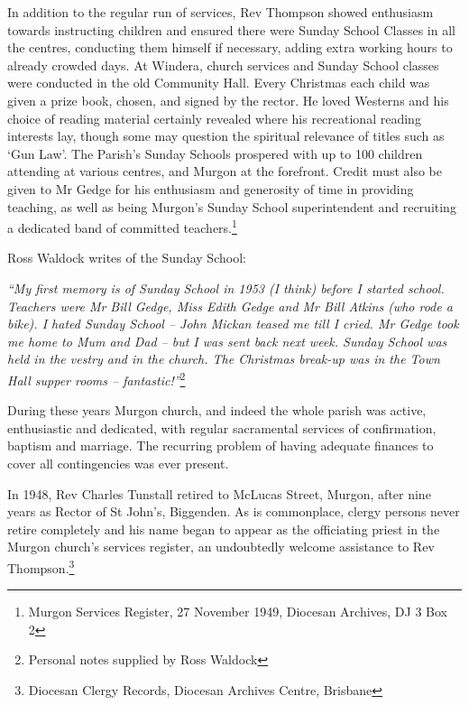 In addition to the regular run of services, Rev Thompson showed enthusiasm towards instructing children and ensured there were Sunday School Classes in all the centres, conducting them himself if necessary, adding extra working hours to already crowded days. At Windera, church services and Sunday School classes were conducted in the old Community Hall. Every Christmas each child was given a prize book, chosen, and signed by the rector. He loved Westerns and his choice of reading material certainly revealed where his recreational reading interests lay, though some may question the spiritual relevance of titles such as `Gun Law'. The Parish's Sunday Schools prospered with up to 100 children attending at various centres, and Murgon at the forefront. Credit must also be given to Mr Gedge for his enthusiasm and generosity of time in providing teaching, as well as being Murgon's Sunday School superintendent and recruiting a dedicated band of committed teachers.\footnote{Murgon Services Register, 27 November 1949, Diocesan Archives, DJ 3 Box 2}


Ross Waldock writes of the Sunday School:



\emph{``My first memory is of Sunday School in 1953 (I think) before I started school. Teachers were Mr Bill Gedge, Miss Edith Gedge and Mr Bill Atkins (who rode a bike). I hated Sunday School -- John Mickan teased me till I cried. Mr Gedge took me home to Mum and Dad -- but I was sent back next week. Sunday School was held in the vestry and in the church. The Christmas break-up was in the Town Hall supper rooms -- fantastic!''}\footnote{Personal notes supplied by Ross Waldock}


\smallskip


During these years Murgon church, and indeed the whole parish was active, enthusiastic and dedicated, with regular sacramental services of confirmation, baptism and marriage. The recurring problem of having adequate finances to cover all contingencies was ever present.



In 1948, Rev Charles Tunstall retired to McLucas Street, Murgon, after nine years as Rector of St John's, Biggenden. As is commonplace, clergy persons never retire completely and his name began to appear as the officiating priest in the Murgon church's services register, an undoubtedly welcome assistance to Rev Thompson.\footnote{Diocesan Clergy Records, Diocesan Archives Centre, Brisbane}


